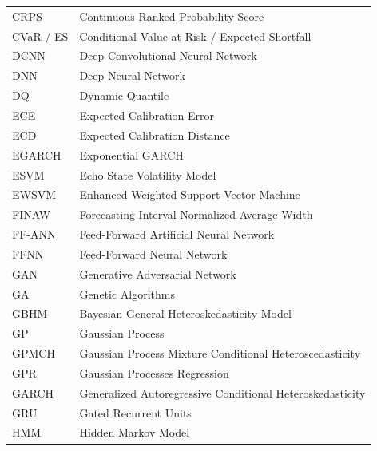 \begin{table}[H]
\begin{subtable}[t]{0.49\textwidth}
\begin{tabular}{lp{}}
        CRPS & Continuous Ranked Probability Score \\
        CVaR / ES & Conditional Value at Risk / Expected Shortfall \\
        DCNN & Deep Convolutional Neural Network \\
        DNN & Deep Neural Network \\
        DQ & Dynamic Quantile \\
        ECE & Expected Calibration Error \\
        ECD & Expected Calibration Distance \\
        EGARCH & Exponential GARCH \\
        ESVM & Echo State Volatility Model \\
        EWSVM & Enhanced Weighted Support Vector Machine \\
        FINAW & Forecasting Interval Normalized Average Width \\
        FF-ANN & Feed-Forward Artificial Neural Network \\
        FFNN & Feed-Forward Neural Network \\
        GAN & Generative Adversarial Network \\
        GA & Genetic Algorithms \\
        GBHM & Bayesian General Heteroskedasticity Model \\
        GP & Gaussian Process \\
        GPMCH & Gaussian Process Mixture Conditional Heteroscedasticity \\
        GPR & Gaussian Processes Regression \\
        GARCH & Generalized Autoregressive Conditional Heteroskedasticity \\
        GRU & Gated Recurrent Units \\
        HMM & Hidden Markov Model \\
        

\end{tabular}
\end{subtable}
\end{table}
